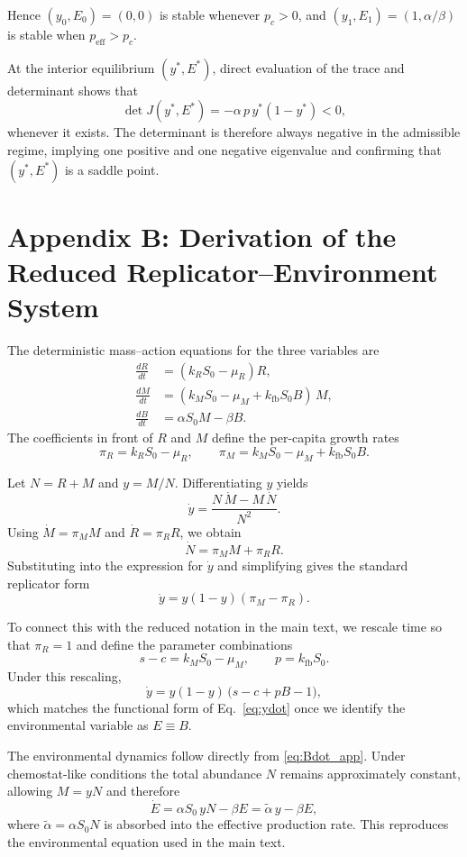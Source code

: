 \documentclass[11pt]{article}
\newcommand{\rev}[1]{#1}
\begin{document}
Hence $(y_0,E_0)=(0,0)$ is stable whenever $p_c>0$, and $(y_1,E_1)=(1,\alpha/\beta)$ is stable when $p_{\mathrm{eff}}>p_c$.

At the interior equilibrium $(y^*,E^*)$, direct evaluation of the trace and determinant shows that
\[
\det J(y^*,E^*)=-\alpha\,p\,y^*(1-y^*)<0,
\]
whenever it exists. The determinant is therefore always negative in the admissible regime, implying one positive and one negative eigenvalue and confirming that $(y^*,E^*)$ is a saddle point.

%
 \section*{Appendix B: Derivation of the Reduced Replicator–Environment System}

The deterministic mass–action equations for the three variables are
\begin{align}
\frac{dR}{dt} &= (k_R S_0 - \mu_R) R, \label{eq:Rdot_app} \\
\frac{dM}{dt} &= (k_M S_0 - \mu_M + k_{\mathrm{fb}} S_0 B)\, M, \label{eq:Mdot_app} \\
\frac{dB}{dt} &= \rev{\alpha S_0} M - \beta B. \label{eq:Bdot_app}
\end{align}
The coefficients in front of $R$ and $M$ define the per-capita growth rates
\[
\pi_R = k_R S_0 - \mu_R, \qquad
\pi_M = k_M S_0 - \mu_M + k_{\mathrm{fb}} S_0 B.
\]

Let $N = R + M$ and $y = M/N$. Differentiating $y$ yields
\[
\dot y = \frac{N\,\dot M - M\,\dot N}{N^2}.
\]
Using $\dot M = \pi_M M$ and $\dot R = \pi_R R$, we obtain
\[
\dot N = \pi_M M + \pi_R R.
\]
Substituting into the expression for $\dot y$ and simplifying gives the standard replicator form
\[
\dot y = y(1-y)(\pi_M - \pi_R).
\]

To connect this with the reduced notation in the main text, we rescale time so that $\pi_R = 1$ and define the parameter combinations
\[
s - c = k_M S_0 - \mu_M, \qquad
p = k_{\mathrm{fb}} S_0.
\]
Under this rescaling,
\[
\dot y = y(1-y)\,\bigl(s - c + pB - 1\bigr),
\]
which matches the functional form of Eq.~\eqref{eq:ydot} once we identify the environmental variable as $E \equiv B$.

The environmental dynamics follow directly from \eqref{eq:Bdot_app}. Under chemostat-like conditions the total abundance $N$ remains approximately constant, allowing $M = yN$ and therefore
\[
\dot E = \rev{\alpha S_0}\, yN - \beta E = \tilde{\alpha}\,y - \beta E,
\]
where $\tilde{\alpha} = \rev{\alpha S_0} N$ is absorbed into the effective production rate. This reproduces the environmental equation used in the main text. 


\end{document}
